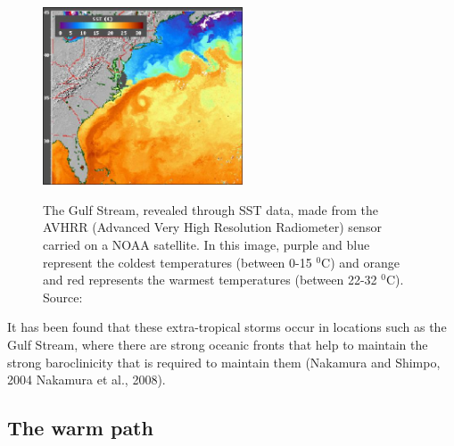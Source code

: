 \begin{figure}[h]
	\centering
	\noindent\includegraphics[width=14pc,angle=0]{GulfStream.jpg}\\ %
	\caption{The Gulf Stream, revealed through SST data, made from the AVHRR (Advanced Very High Resolution Radiometer) sensor carried on a NOAA satellite. In this image, purple and blue represent the coldest temperatures (between 0-15 $^0$C) and orange and red represents the warmest temperatures (between 22-32 $^0$C). Source: \cite{gsnasa}}\label{fig:GS_map}
\end{figure}



It has been found that these extra-tropical storms occur in locations such as the Gulf Stream, where there are strong oceanic fronts that help to maintain the strong baroclinicity that is required to maintain them (Nakamura and Shimpo, 2004 Nakamura et al., 2008).



\subsection{The warm path}

